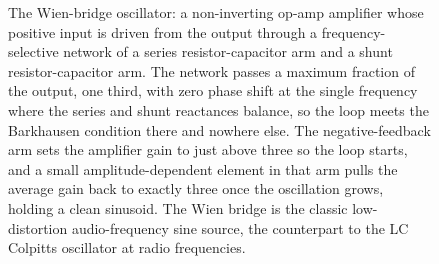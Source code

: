 \begin{figure}[htbp]
\caption[Wien-bridge oscillator]{The Wien-bridge oscillator: a non-inverting
op-amp amplifier whose positive input is driven from the output through a
frequency-selective network of a series resistor-capacitor arm and a shunt
resistor-capacitor arm. The network passes a maximum fraction of the output,
one third, with zero phase shift at the single frequency where the series and
shunt reactances balance, so the loop meets the Barkhausen condition there and
nowhere else. The negative-feedback arm sets the amplifier gain to just above
three so the loop starts, and a small amplitude-dependent element in that arm
pulls the average gain back to exactly three once the oscillation grows, holding
a clean sinusoid. The Wien bridge is the classic low-distortion audio-frequency
sine source, the counterpart to the LC Colpitts oscillator at radio
frequencies.}
\label{fig:vol04ch09:wien-bridge}
\end{figure}
